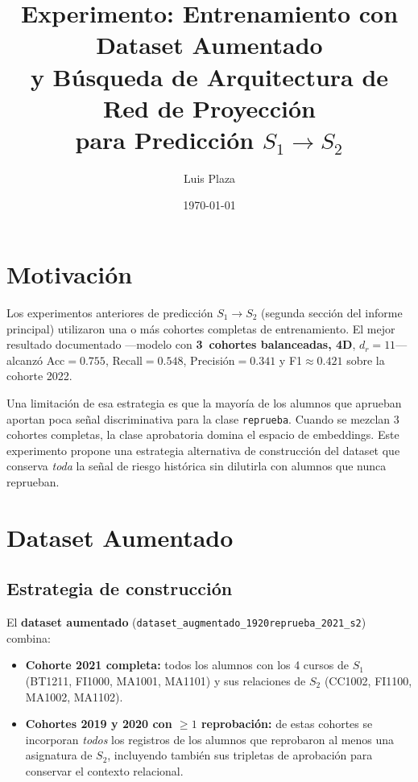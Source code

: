 \documentclass[11pt,a4paper]{article}
\title{%
    Experimento: Entrenamiento con Dataset Aumentado \\
    y Búsqueda de Arquitectura de Red de Proyección \\
    para Predicción $S_1 \to S_2$
}
\author{Luis Plaza}
\date{\today}
\begin{document}
\maketitle
\tableofcontents
\newpage

\section{Motivación}

Los experimentos anteriores de predicción $S_1 \to S_2$ (segunda sección del informe principal) utilizaron una o más cohortes completas de entrenamiento. El mejor resultado documentado —modelo con \textbf{3~cohortes balanceadas, 4D}, $d_r=11$— alcanzó Acc$=0.755$, Recall$=0.548$, Precisión$=0.341$ y F1$\approx 0.421$ sobre la cohorte 2022.

Una limitación de esa estrategia es que la mayoría de los alumnos que aprueban aportan poca señal discriminativa para la clase \texttt{reprueba}. Cuando se mezclan 3 cohortes completas, la clase aprobatoria domina el espacio de embeddings. Este experimento propone una estrategia alternativa de construcción del dataset que conserva \emph{toda} la señal de riesgo histórica sin dilutirla con alumnos que nunca reprueban.

\section{Dataset Aumentado}

\subsection{Estrategia de construcción}

El \textbf{dataset aumentado} (\texttt{dataset\_augmentado\_1920reprueba\_2021\_s2}) combina:

\begin{itemize}
    \item \textbf{Cohorte 2021 completa:} todos los alumnos con los 4 cursos de $S_1$
    (BT1211, FI1000, MA1001, MA1101) y sus relaciones de $S_2$
    (CC1002, FI1100, MA1002, MA1102).
    \item \textbf{Cohortes 2019 y 2020 con $\geq 1$ reprobación:} de estas cohortes se
    incorporan \emph{todos} los registros de los alumnos que reprobaron al menos una
    asignatura de $S_2$, incluyendo también sus tripletas de aprobación para conservar
    el contexto relacional.
\end{itemize}
\end{document}
